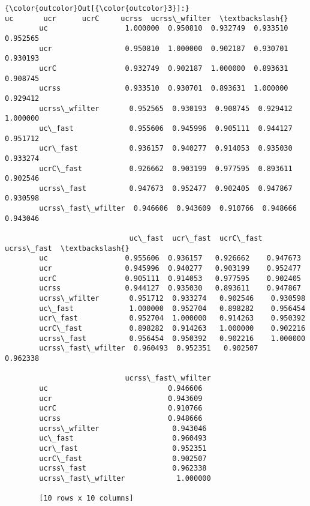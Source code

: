 \documentclass{article}
\begin{document}
            \begin{Verbatim}[commandchars=\\\{\}]
{\color{outcolor}Out[{\color{outcolor}3}]:}                           uc       ucr      ucrC     ucrss  ucrss\_wfilter  \textbackslash{}
        uc                  1.000000  0.950810  0.932749  0.933510       0.952565   
        ucr                 0.950810  1.000000  0.902187  0.930701       0.930193   
        ucrC                0.932749  0.902187  1.000000  0.893631       0.908745   
        ucrss               0.933510  0.930701  0.893631  1.000000       0.929412   
        ucrss\_wfilter       0.952565  0.930193  0.908745  0.929412       1.000000   
        uc\_fast             0.955606  0.945996  0.905111  0.944127       0.951712   
        ucr\_fast            0.936157  0.940277  0.914053  0.935030       0.933274   
        ucrC\_fast           0.926662  0.903199  0.977595  0.893611       0.902546   
        ucrss\_fast          0.947673  0.952477  0.902405  0.947867       0.930598   
        ucrss\_fast\_wfilter  0.946606  0.943609  0.910766  0.948666       0.943046   
        
                             uc\_fast  ucr\_fast  ucrC\_fast  ucrss\_fast  \textbackslash{}
        uc                  0.955606  0.936157   0.926662    0.947673   
        ucr                 0.945996  0.940277   0.903199    0.952477   
        ucrC                0.905111  0.914053   0.977595    0.902405   
        ucrss               0.944127  0.935030   0.893611    0.947867   
        ucrss\_wfilter       0.951712  0.933274   0.902546    0.930598   
        uc\_fast             1.000000  0.952704   0.898282    0.956454   
        ucr\_fast            0.952704  1.000000   0.914263    0.950392   
        ucrC\_fast           0.898282  0.914263   1.000000    0.902216   
        ucrss\_fast          0.956454  0.950392   0.902216    1.000000   
        ucrss\_fast\_wfilter  0.960493  0.952351   0.902507    0.962338   
        
                            ucrss\_fast\_wfilter  
        uc                            0.946606  
        ucr                           0.943609  
        ucrC                          0.910766  
        ucrss                         0.948666  
        ucrss\_wfilter                 0.943046  
        uc\_fast                       0.960493  
        ucr\_fast                      0.952351  
        ucrC\_fast                     0.902507  
        ucrss\_fast                    0.962338  
        ucrss\_fast\_wfilter            1.000000  
        
        [10 rows x 10 columns]
\end{Verbatim}
        
\end{document}

